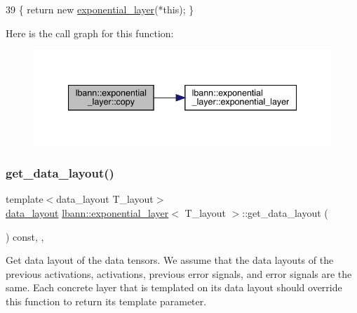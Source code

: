 \begin{DoxyCode}
39 \{ \textcolor{keywordflow}{return} \textcolor{keyword}{new} \hyperlink{classlbann_1_1exponential__layer_a1a0d4f1be9f58235782f04c215589360}{exponential\_layer}(*\textcolor{keyword}{this}); \}
\end{DoxyCode}
Here is the call graph for this function\+:\nopagebreak
\begin{figure}[H]
\begin{center}
\leavevmode
\includegraphics[width=340pt]{classlbann_1_1exponential__layer_ac1f8c1e00ceddeb059f9ee6dd77052af_cgraph}
\end{center}
\end{figure}
\mbox{\label{classlbann_1_1exponential__layer_a0752622c055391421c4916bb02eda923}} 
\subsubsection{\texorpdfstring{get\+\_\+data\+\_\+layout()}{get\_data\_layout()}}
{\footnotesize\ttfamily template$<$data\+\_\+layout T\+\_\+layout$>$ \\
\hyperlink{base_8hpp_a786677cbfb3f5677b4d84f3056eb08db}{data\+\_\+layout} \hyperlink{classlbann_1_1exponential__layer}{lbann\+::exponential\+\_\+layer}$<$ T\+\_\+layout $>$\+::get\+\_\+data\+\_\+layout (\begin{DoxyParamCaption}{ }\end{DoxyParamCaption}) const\hspace{0.3cm}{\ttfamily [inline]}, {\ttfamily [override]}, {\ttfamily [virtual]}}

Get data layout of the data tensors. We assume that the data layouts of the previous activations, activations, previous error signals, and error signals are the same. Each concrete layer that is templated on its data layout should override this function to return its template parameter. 

